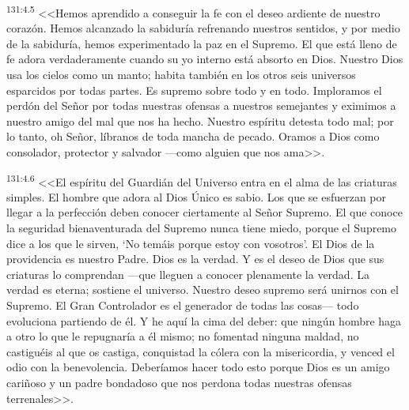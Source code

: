 \par 
\textsuperscript{131:4.5} <<Hemos aprendido a conseguir la fe con el deseo ardiente de nuestro corazón. Hemos alcanzado la sabiduría refrenando nuestros sentidos, y por medio de la sabiduría, hemos experimentado la paz en el Supremo. El que está lleno de fe adora verdaderamente cuando su yo interno está absorto en Dios. Nuestro Dios usa los cielos como un manto; habita también en los otros seis universos esparcidos por todas partes. Es supremo sobre todo y en todo. Imploramos el perdón del Señor por todas nuestras ofensas a nuestros semejantes y eximimos a nuestro amigo del mal que nos ha hecho. Nuestro espíritu detesta todo mal; por lo tanto, oh Señor, líbranos de toda mancha de pecado. Oramos a Dios como consolador, protector y salvador ---como alguien que nos ama>>.

\par 
\textsuperscript{131:4.6} <<El espíritu del Guardián del Universo entra en el alma de las criaturas simples. El hombre que adora al Dios Único es sabio. Los que se esfuerzan por llegar a la perfección deben conocer ciertamente al Señor Supremo. El que conoce la seguridad bienaventurada del Supremo nunca tiene miedo, porque el Supremo dice a los que le sirven, `No temáis porque estoy con vosotros'. El Dios de la providencia es nuestro Padre. Dios es la verdad. Y es el deseo de Dios que sus criaturas lo comprendan ---que lleguen a conocer plenamente la verdad. La verdad es eterna; sostiene el universo. Nuestro deseo supremo será unirnos con el Supremo. El Gran Controlador es el generador de todas las cosas--- todo evoluciona partiendo de él. Y he aquí la cima del deber: que ningún hombre haga a otro lo que le repugnaría a él mismo; no fomentad ninguna maldad, no castiguéis al que os castiga, conquistad la cólera con la misericordia, y venced el odio con la benevolencia. Deberíamos hacer todo esto porque Dios es un amigo cariñoso y un padre bondadoso que nos perdona todas nuestras ofensas terrenales>>.

